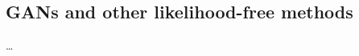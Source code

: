 \documentclass[10pt,letterpaper]{article}
\DeclareMathOperator{\argmax}{argmax}
\begin{document}





\subsection{GANs and other likelihood-free methods}
\ldots
\end{document}
